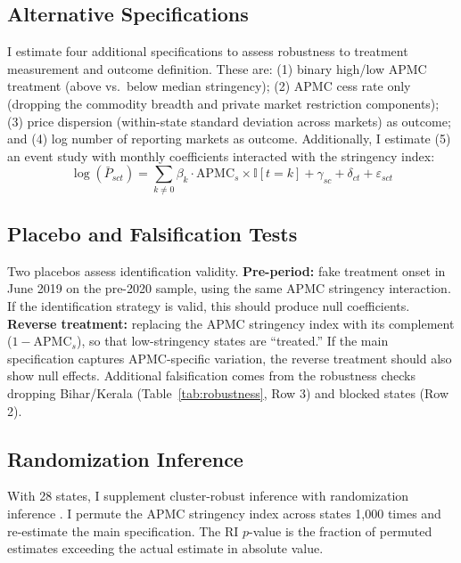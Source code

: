 \documentclass[12pt]{article}
\newcommand{\ind}{\mathbb{I}}
\begin{document}
\subsection{Alternative Specifications}

I estimate four additional specifications to assess robustness to treatment measurement and outcome definition. These are: (1) binary high/low APMC treatment (above vs.\ below median stringency); (2) APMC cess rate only (dropping the commodity breadth and private market restriction components); (3) price dispersion (within-state standard deviation across markets) as outcome; and (4) log number of reporting markets as outcome. Additionally, I estimate (5) an event study with monthly coefficients interacted with the stringency index:
\begin{equation}
\log(\bar{P}_{sct}) = \sum_{k \neq 0} \beta_k \cdot \text{APMC}_s \times \ind[t = k] + \gamma_{sc} + \delta_{ct} + \varepsilon_{sct}
\end{equation}

\subsection{Placebo and Falsification Tests}

Two placebos assess identification validity. \textbf{Pre-period:} fake treatment onset in June 2019 on the pre-2020 sample, using the same APMC stringency interaction. If the identification strategy is valid, this should produce null coefficients. \textbf{Reverse treatment:} replacing the APMC stringency index with its complement ($1 - \text{APMC}_s$), so that low-stringency states are ``treated.'' If the main specification captures APMC-specific variation, the reverse treatment should also show null effects. Additional falsification comes from the robustness checks dropping Bihar/Kerala (Table~\ref{tab:robustness}, Row 3) and blocked states (Row 2).

\subsection{Randomization Inference}

With 28 states, I supplement cluster-robust inference with randomization inference \citep{roth2023pretest}. I permute the APMC stringency index across states 1,000 times and re-estimate the main specification. The RI $p$-value is the fraction of permuted estimates exceeding the actual estimate in absolute value.
\end{document}
